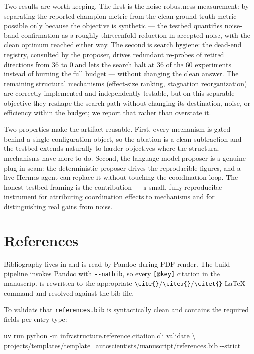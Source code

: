 \documentclass[
]{article}
\newenvironment{Shaded}{}{}
\newcommand{\AttributeTok}[1]{\textcolor[rgb]{0.49,0.56,0.16}{#1}}
\newcommand{\DataTypeTok}[1]{\textcolor[rgb]{0.56,0.13,0.00}{#1}}
\newcommand{\ExtensionTok}[1]{#1}
\newcommand{\NormalTok}[1]{#1}
\begin{document}
Two results are worth keeping. The first is the noise-robustness
measurement: by separating the reported champion metric from the clean
ground-truth metric --- possible only because the objective is synthetic
--- the testbed quantifies noise-band confirmation as a roughly
thirteenfold reduction in accepted noise, with the clean optimum reached
either way. The second is search hygiene: the dead-end registry,
consulted by the proposer, drives redundant re-probes of retired
directions from \(36\) to \(0\) and lets the search halt at \(36\) of
the \(60\) experiments instead of burning the full budget --- without
changing the clean answer. The remaining structural mechanisms
(effect-size ranking, stagnation reorganization) are correctly
implemented and independently testable, but on this separable objective
they reshape the search path without changing its destination, noise, or
efficiency within the budget; we report that rather than overstate it.

Two properties make the artifact reusable. First, every mechanism is
gated behind a single configuration object, so the ablation is a clean
subtraction and the testbed extends naturally to harder objectives where
the structural mechanisms have more to do. Second, the language-model
proposer is a genuine plug-in seam: the deterministic proposer drives
the reproducible figures, and a live Hermes agent can replace it without
touching the coordination loop. The honest-testbed framing is the
contribution --- a small, fully reproducible instrument for attributing
coordination effects to mechanisms and for distinguishing real gains
from noise.

\newpage

\section{References}\label{sec:references}

Bibliography lives in
\href{references.bib}{} and is read by
Pandoc during PDF render. The build pipeline invokes Pandoc with
\texttt{-\/-natbib}, so every \texttt{{[}@key{]}} citation in the
manuscript is rewritten to the appropriate
\texttt{\textbackslash{}cite\{\}}/\texttt{\textbackslash{}citep\{\}}/\texttt{\textbackslash{}citet\{\}}
LaTeX command and resolved against the bib file.

To validate that \texttt{references.bib} is syntactically clean and
contains the required fields per entry type:

\begin{Shaded}
\begin{Highlighting}[]
\ExtensionTok{uv}\NormalTok{ run python }\AttributeTok{{-}m}\NormalTok{ infrastructure.reference.citation.cli validate }\DataTypeTok{\textbackslash{}}
\NormalTok{    projects/templates/template\_autoscientists/manuscript/references.bib }\AttributeTok{{-}{-}strict}
\end{Highlighting}
\end{Shaded}




\clearpage


\end{document}
